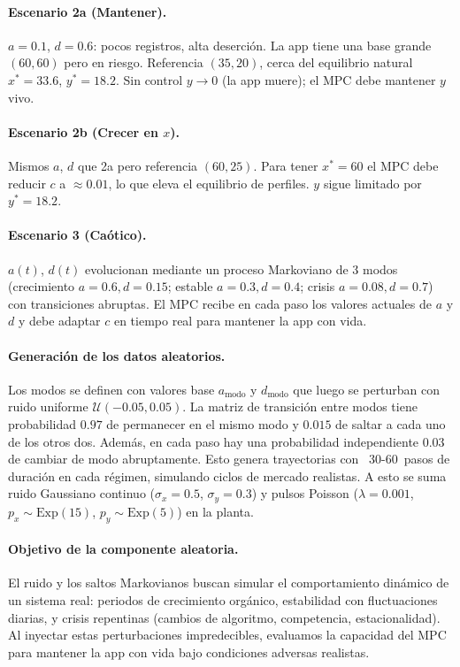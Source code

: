 \documentclass[twocolumn,10pt]{article}
\begin{document}
\paragraph{Escenario 2a (Mantener).}
$a=0.1$, $d=0.6$: pocos registros, alta deserci\'on.
La app tiene una base grande $(60,60)$ pero en riesgo.
Referencia $(35,20)$, cerca del equilibrio natural
$x^*=33.6$, $y^*=18.2$. Sin control $y\to0$ (la app
muere); el MPC debe mantener $y$ vivo.

\paragraph{Escenario 2b (Crecer en $x$).}
Mismos $a$, $d$ que 2a pero referencia $(60,25)$.
Para tener $x^*=60$ el MPC debe reducir $c$ a $\approx0.01$,
lo que eleva el equilibrio de perfiles. $y$ sigue limitado
por $y^*=18.2$.

\paragraph{Escenario 3 (Ca\'otico).}
$a(t)$, $d(t)$ evolucionan mediante un proceso Markoviano
de 3 modos (crecimiento $a=0.6,d=0.15$; estable $a=0.3,d=0.4$;
crisis $a=0.08,d=0.7$) con transiciones abruptas.
El MPC recibe en cada paso los valores actuales de $a$ y $d$
y debe adaptar $c$ en tiempo real para mantener la app con vida.

\paragraph{Generaci\'on de los datos aleatorios.}
Los modos se definen con valores base $a_{\text{modo}}$ y
$d_{\text{modo}}$ que luego se perturban con ruido uniforme
$\mathcal{U}(-0.05,0.05)$. La matriz de transici\'on entre modos
tiene probabilidad $0.97$ de permanecer en el mismo modo y
$0.015$ de saltar a cada uno de los otros dos. Adem\'as, en
cada paso hay una probabilidad independiente $0.03$ de cambiar
de modo abruptamente. Esto genera trayectorias con ~30-60~pasos
de duraci\'on en cada r\'egimen, simulando ciclos de mercado
realistas. A esto se suma ruido Gaussiano continuo
($\sigma_x=0.5$, $\sigma_y=0.3$) y pulsos Poisson
($\lambda=0.001$, $p_x\!\sim\!\text{Exp}(15)$,
$p_y\!\sim\!\text{Exp}(5)$) en la planta.

\paragraph{Objetivo de la componente aleatoria.}
El ruido y los saltos Markovianos buscan simular el comportamiento
din\'amico de un sistema real: periodos de
crecimiento org\'anico, estabilidad con fluctuaciones diarias,
y crisis repentinas (cambios de algoritmo, competencia,
estacionalidad). Al inyectar estas perturbaciones impredecibles,
evaluamos la capacidad del MPC para mantener la app con vida
bajo condiciones adversas realistas.
\end{document}
